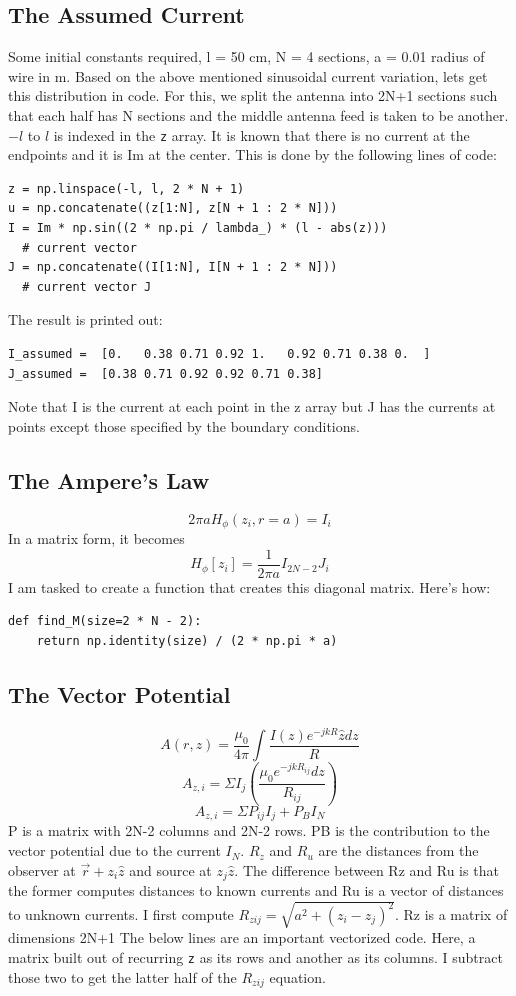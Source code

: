 \documentclass[11pt, a4paper]{article}
\begin{document}
\subsection{The Assumed Current}
Some initial constants required, l = 50 cm, N = 4 sections, a = 0.01 radius of wire in m. Based on the above mentioned sinusoidal current variation, lets get this distribution in code. For this, we split the antenna into 2N+1 sections such that each half has N sections and the middle antenna feed is taken to be another.
$-l$ to $l$ is indexed in the \texttt{z} array. It is known that there is no current at the endpoints and it is Im at the center. This is done by the following lines of code:
\begin{verbatim}
z = np.linspace(-l, l, 2 * N + 1)
u = np.concatenate((z[1:N], z[N + 1 : 2 * N]))
I = Im * np.sin((2 * np.pi / lambda_) * (l - abs(z)))
  # current vector
J = np.concatenate((I[1:N], I[N + 1 : 2 * N]))
  # current vector J

\end{verbatim}
The result is printed out:
\begin{verbatim}
I_assumed =  [0.   0.38 0.71 0.92 1.   0.92 0.71 0.38 0.  ]
J_assumed =  [0.38 0.71 0.92 0.92 0.71 0.38] 
\end{verbatim}
Note that I is the current at each point in the z array but J has the currents at points except those specified by the boundary conditions.

\subsection{The Ampere's Law}
$$2\pi aH_{\phi}(z_{i}, r=a)=I_{i}$$
In a matrix form, it becomes 
$$H_{\phi}[z_{i}]=\frac{1}{2\pi a}I_{2N-2}J_i$$
I am tasked to create a function that creates this diagonal matrix. Here's how:
\begin{verbatim}
def find_M(size=2 * N - 2):
    return np.identity(size) / (2 * np.pi * a)
\end{verbatim}

\subsection{The Vector Potential}
$$A(r,z) = \frac{\mu_0}{4\pi}\int \frac{I(z)e^{-jkR}\hat{z}dz}{R}$$
$$A_{z,i}=\Sigma I_j(\frac{\mu_0e^{-jkR_{ij}}dz}{R_{ij}})$$
$$A_{z, i} = \Sigma P_{ij}I_j+P_BI_N$$
P is a matrix with 2N-2 columns and 2N-2 rows. PB is the contribution to the vector potential due to the current $I_N$. $R_z$ and $R_u$ are the distances from the observer at $\vec{r}+z_i\hat{z}$ and source at $z_j\hat{z}$. The difference between Rz and Ru is that the former computes distances to known currents and Ru is a vector of distances to unknown currents. I first compute $R_{zij} = \sqrt{a^2+(z_i-z_j)^2}$. Rz is a matrix of dimensions 2N+1 The below lines are an important vectorized code. Here, a matrix built out of recurring \texttt{z} as its rows and another as its columns. I subtract those two to get the latter half of the $R_{zij}$ equation. 
\end{document}
